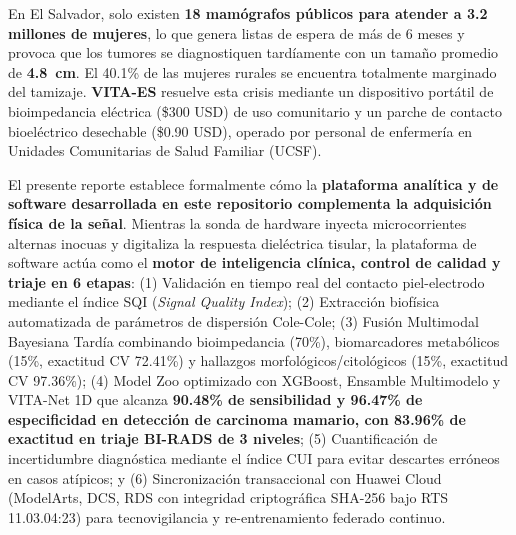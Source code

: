 \documentclass[11pt,a4paper]{article}
\begin{document}
\vspace{0.3cm}

\begin{wordcallout}[title=Resumen Ejecutivo y Declaración de Complementariedad]
En El Salvador, solo existen \textbf{18 mamógrafos públicos para atender a 3.2 millones de mujeres}, lo que genera listas de espera de más de 6 meses y provoca que los tumores se diagnostiquen tardíamente con un tamaño promedio de \textbf{4.8~cm}. El 40.1\% de las mujeres rurales se encuentra totalmente marginado del tamizaje. \textbf{VITA-ES} resuelve esta crisis mediante un dispositivo portátil de bioimpedancia eléctrica (\$300 USD) de uso comunitario y un parche de contacto bioeléctrico desechable (\$0.90 USD), operado por personal de enfermería en Unidades Comunitarias de Salud Familiar (UCSF). 

El presente reporte establece formalmente cómo la \textbf{plataforma analítica y de software desarrollada en este repositorio complementa la adquisición física de la señal}. Mientras la sonda de hardware inyecta microcorrientes alternas inocuas y digitaliza la respuesta dieléctrica tisular, la plataforma de software actúa como el \textbf{motor de inteligencia clínica, control de calidad y triaje en 6 etapas}: (1) Validación en tiempo real del contacto piel-electrodo mediante el índice SQI (\textit{Signal Quality Index}); (2) Extracción biofísica automatizada de parámetros de dispersión Cole-Cole; (3) Fusión Multimodal Bayesiana Tardía combinando bioimpedancia (70\%), biomarcadores metabólicos (15\%, exactitud CV 72.41\%) y hallazgos morfológicos/citológicos (15\%, exactitud CV 97.36\%); (4) Model Zoo optimizado con XGBoost, Ensamble Multimodelo y VITA-Net 1D que alcanza \textbf{90.48\% de sensibilidad y 96.47\% de especificidad en detección de carcinoma mamario, con 83.96\% de exactitud en triaje BI-RADS de 3 niveles}; (5) Cuantificación de incertidumbre diagnóstica mediante el índice CUI para evitar descartes erróneos en casos atípicos; y (6) Sincronización transaccional con Huawei Cloud (ModelArts, DCS, RDS con integridad criptográfica SHA-256 bajo RTS 11.03.04:23) para tecnovigilancia y re-entrenamiento federado continuo.
\end{wordcallout}

\vspace{0.2cm}
\tableofcontents
\vspace{0.4cm}
\end{document}
